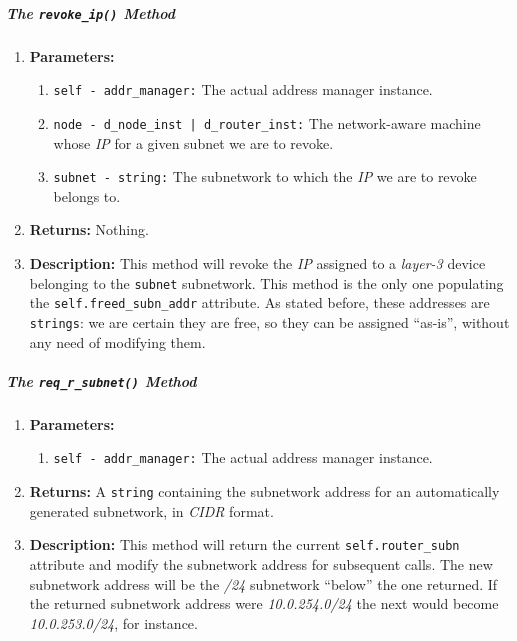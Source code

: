        \subparagraph{The \texttt{revoke\_ip()} Method}
            \begin{enumerate}
                \item \textbf{Parameters:}
                \begin{enumerate}
                    \item \texttt{self - addr\_manager:} The actual address manager instance.
                    \item \texttt{node - d\_node\_inst | d\_router\_inst:} The network-aware machine whose \textit{IP} for a given subnet we are to revoke.
                    \item \texttt{subnet - string:} The subnetwork to which the \textit{IP} we are to revoke belongs to.
                \end{enumerate}
                \item \textbf{Returns:} Nothing.
                \item \textbf{Description:} This method will revoke the \textit{IP} assigned to a \textit{layer-3} device belonging to the \texttt{subnet} subnetwork. This method is the only one populating the \texttt{self.freed\_subn\_addr} attribute. As stated before, these addresses are \texttt{strings}: we are certain they are free, so they can be assigned ``as-is'', without any need of modifying them.
            \end{enumerate}

        \subparagraph{The \texttt{req\_r\_subnet()} Method}
            \begin{enumerate}
                \item \textbf{Parameters:}
                \begin{enumerate}
                    \item \texttt{self - addr\_manager:} The actual address manager instance.
                \end{enumerate}
                \item \textbf{Returns:} A \texttt{string} containing the subnetwork address for an automatically generated subnetwork, in \textit{CIDR} format.
                \item \textbf{Description:} This method will return the current \texttt{self.router\_subn} attribute and modify the subnetwork address for subsequent calls. The new subnetwork address will be the \textit{/24} subnetwork ``below'' the one returned. If the returned subnetwork address were \textit{10.0.254.0/24} the next would become \textit{10.0.253.0/24}, for instance.
            \end{enumerate}

